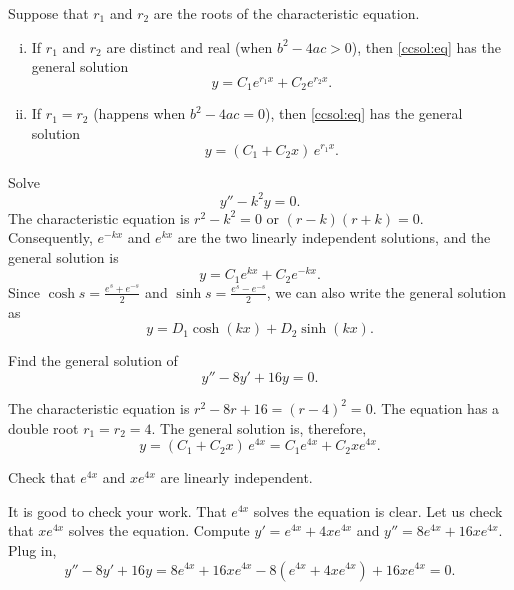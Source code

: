 \begin{theorem}
Suppose that $r_1$ and $r_2$ are the roots of the characteristic equation.
\begin{enumerate}[(i)]
\item If $r_1$ and $r_2$ are distinct and real (when $b^2 - 4ac > 0$),
then \eqref{ccsol:eq} has the general solution
\begin{equation*}
y = C_1 e^{r_1 x} + C_2 e^{r_2 x} .
\end{equation*}
\item If $r_1 = r_2$ (happens when $b^2 - 4ac = 0$), 
then \eqref{ccsol:eq} has the general solution
\begin{equation*}
y = (C_1 + C_2 x)\, e^{r_1 x} .
\end{equation*}
\end{enumerate}
\end{theorem}

\begin{example} \label{example:expsecondorder}
Solve
\begin{equation*}
y'' - k^2 y = 0 .
\end{equation*}
The characteristic equation is $r^2 - k^2 = 0$ or 
$(r-k)(r+k) = 0$.  Consequently, $e^{-k x}$ and $e^{kx}$ are the two
linearly independent solutions, and the general solution is
\begin{equation*}
y = C_1 e^{kx} + C_2e^{-kx} .
\end{equation*}
Since
$\cosh s = \frac{e^s+e^{-s}}{2}$
and
$\sinh s = \frac{e^s-e^{-s}}{2}$,
we can also write the general solution
as
\begin{equation*}
y = D_1 \cosh(kx) + D_2 \sinh(kx) .
\end{equation*}
\end{example}

\begin{example}
Find the general solution of
\begin{equation*}
y'' -8 y' + 16 y = 0 .
\end{equation*}

The characteristic equation is $r^2 - 8 r + 16 = {(r-4)}^2 = 0$.
The equation has a 
double root $r_1 = r_2 = 4$.  The general solution is, therefore,
\begin{equation*}
y = (C_1 + C_2 x)\, e^{4 x} = C_1 e^{4x} + C_2 x e^{4x} .
\end{equation*}

\begin{exercise}
Check that $e^{4x}$ and $x e^{4x}$ are linearly independent.
\end{exercise}

It is good to check your work.
That $e^{4x}$ solves the equation is clear.
Let us check that
$x e^{4x}$ solves the equation.
Compute
$y' = e^{4x} + 4xe^{4x}$ and
$y'' = 8 e^{4x} + 16xe^{4x}$.  Plug in,
\begin{equation*}
y'' - 8 y' + 16 y = 
8 e^{4x} + 16xe^{4x} - 8(e^{4x} + 4xe^{4x}) + 16 xe^{4x} = 
0 .
\end{equation*}
\end{example}

